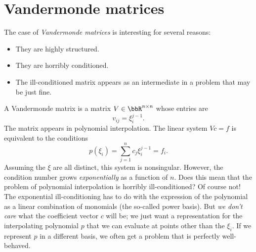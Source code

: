 \section{Vandermonde matrices}

The case of {\em Vandermonde matrices} is interesting for several
reasons:
\begin{itemize}
  \item They are highly structured.
  \item They are horribly conditioned.
  \item The ill-conditioned matrix appears as an intermediate
    in a problem that may be just fine.
\end{itemize}

A Vandermonde matrix is a matrix $V \in \bbR^{n \times n}$
whose entries are
\[
  v_{ij} = \xi_i^{j-1}.
\]
The matrix appears in polynomial interpolation.  The linear
system $Vc = f$ is equivalent to the conditions
\[
  p(\xi_i) = \sum_{j=1}^n c_j \xi_i^{j-1} = f_i.
\]
Assuming the $\xi$ are all distinct, this system is nonsingular.
However, the condition number grows {\em exponentially} as a
function of $n$.  Does this mean that the problem of polynomial
interpolation is horribly ill-conditioned?  Of course not!
The exponential ill-conditioning has to do with the expression
of the polynomial as a linear combination of monomials (the
so-called power basis).   But {\em we don't care} what the coefficient
vector $c$ will be; we just want a representation for the
interpolating polynomial $p$ that we can evaluate at points
other than the $\xi_i$.  If we represent $p$ in a different basis,
we often get a problem that is perfectly well-behaved.
